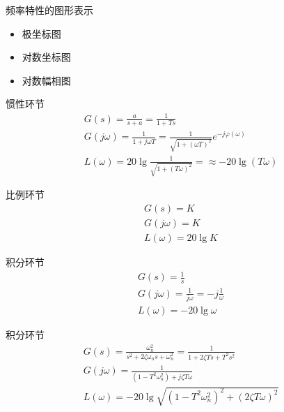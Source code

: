  \begin{frame}
 \begin{block}{频率特性的图形表示}
\begin{itemize}
\item 极坐标图
\item 对数坐标图
\item 对数幅相图
\end{itemize}
\end{block}
\end{frame}

\begin{frame}
\begin{block}{惯性环节}
 \begin{eqnarray*}
G(s)=\frac{a}{s+a}=\frac{1}{1+Ts}\\
G(j\omega)=\frac{1}{1+j\omega T}=\frac{1}{\sqrt{1+(\omega T)^2}}e^{-j\varphi(\omega)}\\
L(\omega)=20\lg \frac{1}{\sqrt{1+(T\omega)^2}}=\approx -20\lg (T\omega)
\end{eqnarray*}
\end{block}
\end{frame}

\begin{frame}
\begin{block}{比例环节}
 \begin{eqnarray*}
G(s)=K\\
G(j\omega)=K\\
L(\omega)=20\lg K
\end{eqnarray*}
\end{block}
\end{frame}

\begin{frame}
\begin{block}{积分环节}
 \begin{eqnarray*}
G(s)=\frac{1}{s}\\
G(j\omega)=\frac{1}{j\omega}=-j\frac{1}{\omega}\\
L(\omega)=-20\lg \omega
\end{eqnarray*}
\end{block}
\end{frame}

\begin{frame}
\begin{block}{积分环节}
 \begin{eqnarray*}
G(s)=\frac{\omega_n^2}{s^2+2\zeta\omega_ns+\omega_n^2}=\frac{1}{1+2\zeta Ts+T^2s^2}\\
G(j\omega)=\frac{1}{(1-T^2\omega_n^2)+j\zeta T\omega}\\
L(\omega)=-20\lg\sqrt{(1-T^2\omega_n^2)^2+(2\zeta T\omega)^2}
\end{eqnarray*}
\end{block}
\end{frame}